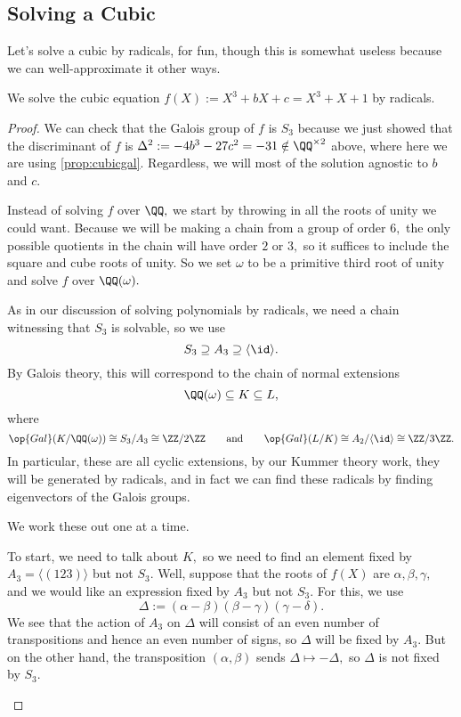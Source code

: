 \documentclass[../notes.tex]{subfiles}
\begin{document}
\subsection{Solving a Cubic}
Let's solve a cubic by radicals, for fun, though this is somewhat useless because we can well-approximate it other ways.
\begin{exe}
	We solve the cubic equation $f(X):=X^3+bX+c=X^3+X+1$ by radicals.
\end{exe}
\begin{proof}
	We can check that the Galois group of $f$ is $S_3$ because we just showed that the discriminant of $f$ is $\Delta^2:=-4b^3-27c^2=-31\notin\QQ^{\times2}$ above, where here we are using \autoref{prop:cubicgal}. Regardless, we will most of the solution agnostic to $b$ and $c.$

	Instead of solving $f$ over $\QQ,$ we start by throwing in all the roots of unity we could want. Because we will be making a chain from a group of order $6,$ the only possible quotients in the chain will have order $2$ or $3,$ so it suffices to include the square and cube roots of unity. So we set $\omega$ to be a primitive third root of unity and solve $f$ over $\QQ(\omega).$

	As in our discussion of solving polynomials by radicals, we need a chain witnessing that $S_3$ is solvable, so we use
	\[S_3\supseteq A_3\supseteq\langle\id\rangle.\]
	By Galois theory, this will correspond to the chain of normal extensions
	\[\QQ(\omega)\subseteq K\subseteq L,\]
	where
	\[\op{Gal}(K/\QQ(\omega))\cong S_3/A_3\cong\ZZ/2\ZZ\qquad\text{and}\qquad\op{Gal}(L/K)\cong A_2/\langle\id\rangle\cong\ZZ/3\ZZ.\]
	In particular, these are all cyclic extensions, by our Kummer theory work, they will be generated by radicals, and in fact we can find these radicals by finding eigenvectors of the Galois groups.

	We work these out one at a time.
	\begin{listroman}
		\item To start, we need to talk about $K,$ so we need to find an element fixed by $A_3=\langle(123)\rangle$ but not $S_3.$ Well, suppose that the roots of $f(X)$ are $\alpha,\beta,\gamma,$ and we would like an expression fixed by $A_3$ but not $S_3.$ For this, we use
		\[\Delta:=(\alpha-\beta)(\beta-\gamma)(\gamma-\delta).\]
		We see that the action of $A_3$ on $\Delta$ will consist of an even number of transpositions and hence an even number of signs, so $\Delta$ will be fixed by $A_3.$ But on the other hand, the transposition $(\alpha,\beta)$ sends $\Delta\mapsto-\Delta,$ so $\Delta$ is not fixed by $S_3.$
		

\end{listroman}
\end{proof}
\end{document}
